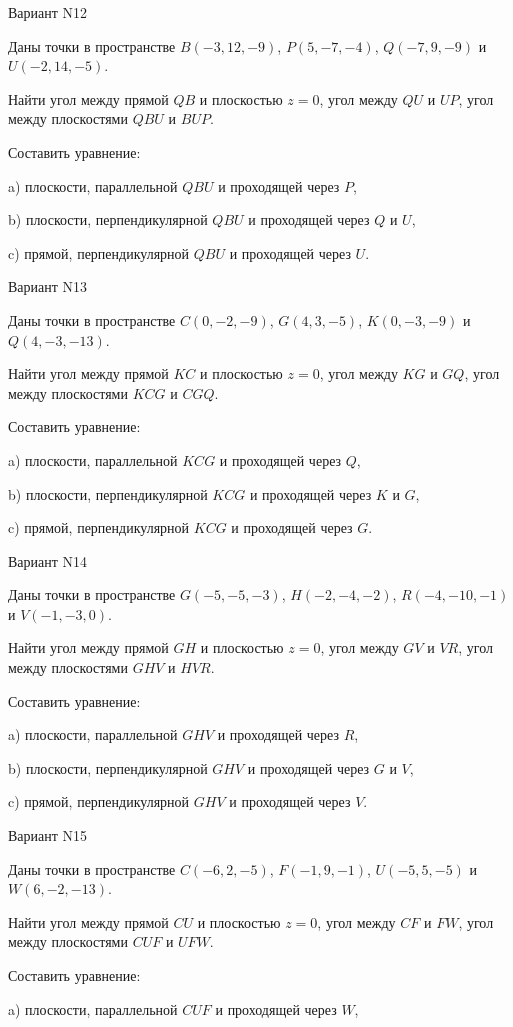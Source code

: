 \documentclass[11pt]{report}
\begin{document}
Вариант N12

Даны точки в пространстве
$B(-3, 12, -9)$, $P(5, -7, -4)$, $Q(-7, 9, -9)$ и
$U(-2, 14, -5)$.

Найти угол между прямой $QB$ и плоскостью $z = 0$, угол между $QU$ и $UP$, угол между плоскостями $QBU$ 
и $BUP$.

Составить уравнение: 

a) плоскости, параллельной $QBU$ и проходящей через $P$,

b) плоскости, перпендикулярной $QBU$ и проходящей через $Q$ и $U$,

c) прямой, перпендикулярной $QBU$ и проходящей через $U$.

Вариант N13

Даны точки в пространстве
$C(0, -2, -9)$, $G(4, 3, -5)$, $K(0, -3, -9)$ и
$Q(4, -3, -13)$.

Найти угол между прямой $KC$ и плоскостью $z = 0$, угол между $KG$ и $GQ$, угол между плоскостями $KCG$ 
и $CGQ$.

Составить уравнение: 

a) плоскости, параллельной $KCG$ и проходящей через $Q$,

b) плоскости, перпендикулярной $KCG$ и проходящей через $K$ и $G$,

c) прямой, перпендикулярной $KCG$ и проходящей через $G$.

Вариант N14

Даны точки в пространстве
$G(-5, -5, -3)$, $H(-2, -4, -2)$, $R(-4, -10, -1)$ и
$V(-1, -3, 0)$.

Найти угол между прямой $GH$ и плоскостью $z = 0$, угол между $GV$ и $VR$, угол между плоскостями $GHV$ 
и $HVR$.

Составить уравнение: 

a) плоскости, параллельной $GHV$ и проходящей через $R$,

b) плоскости, перпендикулярной $GHV$ и проходящей через $G$ и $V$,

c) прямой, перпендикулярной $GHV$ и проходящей через $V$.

Вариант N15

Даны точки в пространстве
$C(-6, 2, -5)$, $F(-1, 9, -1)$, $U(-5, 5, -5)$ и
$W(6, -2, -13)$.

Найти угол между прямой $CU$ и плоскостью $z = 0$, угол между $CF$ и $FW$, угол между плоскостями $CUF$ 
и $UFW$.

Составить уравнение: 

a) плоскости, параллельной $CUF$ и проходящей через $W$,
\end{document}
